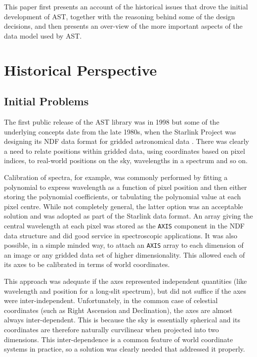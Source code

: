 \documentclass[final,authoryear,5p,times,twocolumn]{elsarticle}
\begin{document}
This paper first presents an account of the historical issues that drove
the initial development of AST, together with the reasoning behind some
of the design decisions, and then presents an over-view of the more
important aspects of the data model used by AST.

\section{Historical Perspective}

\subsection{Initial Problems}

The first public release of the AST library was in 1998
\citep{1998StarB..20....6L,1998StarB..20....7D} but some of the
underlying concepts date from the late 1980s, when the Starlink
Project was designing its NDF data format for gridded astronomical
data \citep{2015Jenness}. There was clearly a need to relate positions
within gridded data, using coordinates based on pixel indices, to
real-world positions on the sky, wavelengths in a spectrum and so
on.

Calibration of spectra, for example, was commonly performed by fitting
a polynomial to express wavelength as a function of pixel position and
then either storing the polynomial coefficients, or tabulating the
polynomial value at each pixel centre. While not completely general,
the latter option was an acceptable solution and was adopted as part
of the Starlink data format. An array giving the central wavelength at
each pixel was stored as the \texttt{AXIS} component in the NDF data
structure and did good service in spectroscopic applications. It was
also possible, in a simple minded way, to attach an \texttt{AXIS}
array to each dimension of an image or any gridded data set of higher
dimensionality. This allowed each of its axes to be calibrated in
terms of world coordinates.

This approach was adequate if the axes represented independent
quantities (like wavelength and position for a long-slit spectrum),
but did not suffice if the axes were inter-independent. Unfortunately,
in the common case of celestial coordinates (such as Right Ascension
and Declination), the axes are almost always inter-dependent. This is
because the sky is essentially spherical and its coordinates are
therefore naturally curvilinear when projected into two
dimensions. This inter-dependence is a common feature of world
coordinate systems in practice, so a solution was clearly needed that
addressed it properly.
\end{document}
